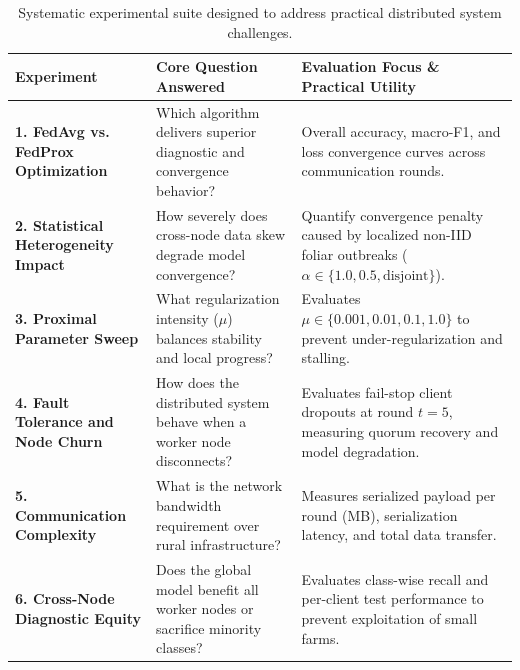 \documentclass[applsci,article,submit,oneauthor,pdftex]{Definitions/mdpi}
\begin{document}
\begin{table}[H]
\centering
\small
\caption{Systematic experimental suite designed to address practical distributed system challenges.}
\label{tab:experiments_overview}
\begin{tabularx}{\textwidth}{P{3.4cm} P{3.5cm} Q}
\toprule
\textbf{Experiment} & \textbf{Core Question Answered} & \textbf{Evaluation Focus \& Practical Utility} \\
\midrule
\textbf{1. FedAvg vs. FedProx Optimization} & Which algorithm delivers superior diagnostic and convergence behavior? & Overall accuracy, macro-F1, and loss convergence curves across communication rounds. \\
\textbf{2. Statistical Heterogeneity Impact} & How severely does cross-node data skew degrade model convergence? & Quantify convergence penalty caused by localized non-IID foliar outbreaks ($\alpha \in \{1.0, 0.5, \text{disjoint}\}$). \\
\textbf{3. Proximal Parameter Sweep} & What regularization intensity ($\mu$) balances stability and local progress? & Evaluates $\mu \in \{0.001, 0.01, 0.1, 1.0\}$ to prevent under-regularization and stalling. \\
\textbf{4. Fault Tolerance and Node Churn} & How does the distributed system behave when a worker node disconnects? & Evaluates fail-stop client dropouts at round $t=5$, measuring quorum recovery and model degradation. \\
\textbf{5. Communication Complexity} & What is the network bandwidth requirement over rural infrastructure? & Measures serialized payload per round (MB), serialization latency, and total data transfer. \\
\textbf{6. Cross-Node Diagnostic Equity} & Does the global model benefit all worker nodes or sacrifice minority classes? & Evaluates class-wise recall and per-client test performance to prevent exploitation of small farms. \\
\bottomrule
\end{tabularx}
\end{table}
\end{document}
